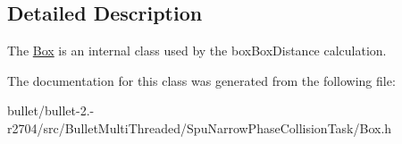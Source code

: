 \subsection{Detailed Description}
The \hyperlink{class_box}{Box} is an internal class used by the box\+Box\+Distance calculation. 

The documentation for this class was generated from the following file\+:\begin{DoxyCompactItemize}
\item 
bullet/bullet-\/2.-\/r2704/src/\+Bullet\+Multi\+Threaded/\+Spu\+Narrow\+Phase\+Collision\+Task/Box.\+h\end{DoxyCompactItemize}
